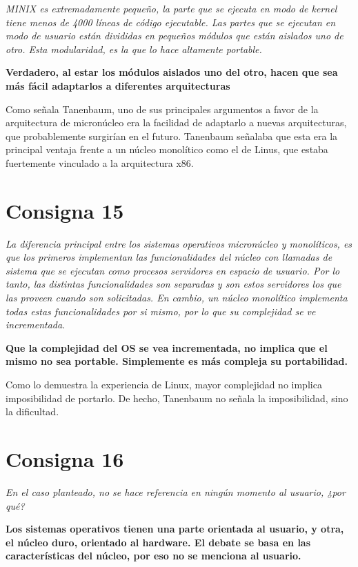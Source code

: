 \documentclass[11pt]{article}
\begin{document}
\emph{MINIX es extremadamente pequeño, la parte que se ejecuta en modo de kernel
tiene menos de 4000 líneas de código ejecutable. Las partes que se ejecutan en
modo de usuario están divididas en pequeños módulos que están aislados uno de
otro. Esta modularidad, es la que lo hace altamente portable.}

\textbf{Verdadero, al estar los módulos aislados uno del otro, hacen que sea más
fácil adaptarlos a diferentes arquitecturas}

Como señala Tanenbaum, uno de sus principales argumentos a favor de la
arquitectura de micronúcleo era la facilidad de adaptarlo a nuevas
arquitecturas, que probablemente surgirían en el futuro. Tanenbaum señalaba que 
esta era la principal ventaja frente a un núcleo monolítico como el de Linus,
que estaba fuertemente vinculado a la arquitectura x86.

\section*{Consigna 15}

\emph{
La diferencia principal entre los sistemas operativos micronúcleo y monolíticos,
es que los primeros implementan las funcionalidades del núcleo con llamadas de
sistema que se ejecutan como procesos servidores en espacio de usuario. Por lo
tanto, las distintas funcionalidades son separadas y son estos servidores los
que las proveen cuando son solicitadas. En cambio, un núcleo monolítico
implementa todas estas funcionalidades por si mismo, por lo que su complejidad
se ve incrementada.
}

\textbf{
     Que la complejidad del OS se vea incrementada, no implica que el mismo no sea
portable. Simplemente es más compleja su portabilidad.
}

Como lo demuestra la experiencia de Linux, mayor complejidad no implica
imposibilidad de portarlo. De hecho, Tanenbaum no señala la imposibilidad, sino 
la dificultad.

\section*{Consigna 16}

\emph{
En el caso planteado, no se hace referencia en ningún momento al usuario, ¿por
qué?
}

\textbf{
Los sistemas operativos tienen una parte orientada al usuario, y otra, el núcleo
duro, orientado al hardware. El debate se basa en las características del
núcleo, por eso no se menciona al usuario.
}
\end{document}

